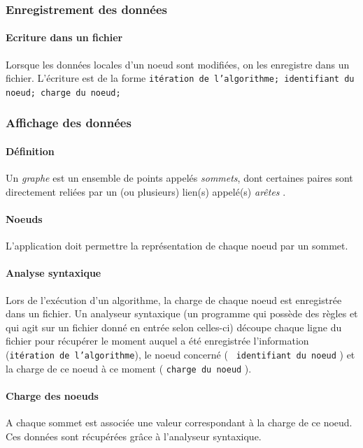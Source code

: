 \documentclass[12pt]{article}
\begin{document}
\subsubsection{Enregistrement des données}

\paragraph{Ecriture dans un fichier} Lorsque les données locales d'un noeud sont modifiées, on les enregistre dans un fichier.
L'écriture est de la forme \texttt{itération de l'algorithme; identifiant du noeud; charge du noeud;}

\subsubsection{Affichage des données}

\paragraph{Définition} Un \textit{graphe} est un ensemble de points appelés \textit{sommets}, dont certaines paires sont directement reliées par un (ou plusieurs) lien(s) appelé(s) \textit{arêtes} \cite{graphe}. 

\paragraph{Noeuds} L'application doit permettre la représentation de chaque noeud par un sommet.

\paragraph{Analyse syntaxique} Lors de l'exécution d'un algorithme, la charge de chaque noeud est enregistrée dans un fichier.
Un analyseur syntaxique (un programme qui possède des règles et qui agit sur un fichier donné en entrée selon celles-ci) découpe chaque ligne du fichier pour récupérer le moment auquel a été enregistrée l'information (\texttt{itération de l'algorithme}),
le noeud concerné ( \texttt{ identifiant du noeud} ) et la charge de ce noeud à ce moment ( \texttt{charge du noeud} ).

\paragraph{Charge des noeuds} A chaque sommet est associée une valeur correspondant à la charge de ce noeud.
Ces données sont récupérées grâce à l'analyseur syntaxique.
\end{document}
